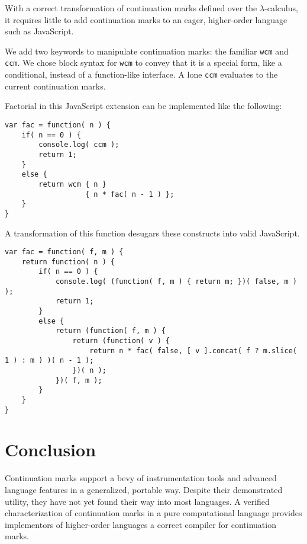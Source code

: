 \documentclass{llncs}
\newcommand{\lc}[0]{$\lambda$-calculus}
\begin{document}
With a correct transformation of continuation marks defined over the \lc, it requires little to add continuation marks to an eager, higher-order language such as JavaScript.

We add two keywords to manipulate continuation marks: the familiar \texttt{wcm} and \texttt{ccm}. We chose block syntax for \texttt{wcm} to convey that it is a special form, like a conditional, instead of a function-like interface. A lone \texttt{ccm} evaluates to the current continuation marks.

Factorial in this JavaScript extension can be implemented like the following:
\begin{verbatim}
var fac = function( n ) {
    if( n == 0 ) {
        console.log( ccm );
        return 1;
    }
    else {
        return wcm { n }
                   { n * fac( n - 1 ) };
    }
}
\end{verbatim}

A transformation of this function desugars these constructs into valid JavaScript.
\begin{verbatim}
var fac = function( f, m ) {
    return function( n ) {
        if( n == 0 ) {
            console.log( (function( f, m ) { return m; })( false, m ) );
            return 1;
        }
        else {
            return (function( f, m ) {
                return (function( v ) {
                    return n * fac( false, [ v ].concat( f ? m.slice( 1 ) : m ) )( n - 1 );
                })( n );
            })( f, m );
        }
    }
}
\end{verbatim} 

\section{Conclusion}

Continuation marks support a bevy of instrumentation tools and advanced language features in a generalized, portable way. Despite their demonstrated utility, they have not yet found their way into most languages. A verified characterization of continuation marks in a pure computational language provides implementors of higher-order languages a correct compiler for continuation marks.



\end{document}
